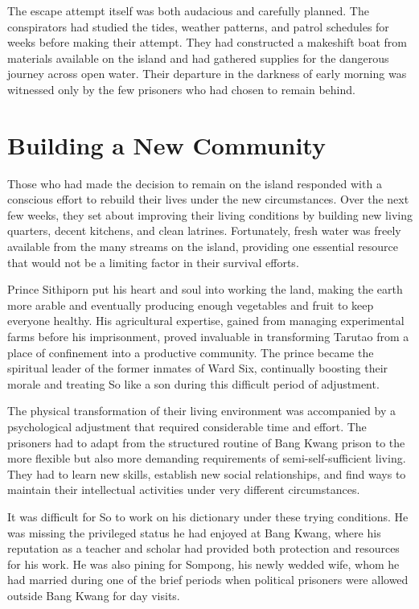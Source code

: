 \documentclass[
  Letterpaper,
]{scrbook}
\begin{document}
The escape attempt itself was both audacious and carefully planned. The
conspirators had studied the tides, weather patterns, and patrol
schedules for weeks before making their attempt. They had constructed a
makeshift boat from materials available on the island and had gathered
supplies for the dangerous journey across open water. Their departure in
the darkness of early morning was witnessed only by the few prisoners
who had chosen to remain behind.

\section{Building a New Community}\label{building-a-new-community}

Those who had made the decision to remain on the island responded with a
conscious effort to rebuild their lives under the new circumstances.
Over the next few weeks, they set about improving their living
conditions by building new living quarters, decent kitchens, and clean
latrines. Fortunately, fresh water was freely available from the many
streams on the island, providing one essential resource that would not
be a limiting factor in their survival efforts.

Prince Sithiporn put his heart and soul into working the land, making
the earth more arable and eventually producing enough vegetables and
fruit to keep everyone healthy. His agricultural expertise, gained from
managing experimental farms before his imprisonment, proved invaluable
in transforming Tarutao from a place of confinement into a productive
community. The prince became the spiritual leader of the former inmates
of Ward Six, continually boosting their morale and treating So like a
son during this difficult period of adjustment.

The physical transformation of their living environment was accompanied
by a psychological adjustment that required considerable time and
effort. The prisoners had to adapt from the structured routine of Bang
Kwang prison to the more flexible but also more demanding requirements
of semi-self-sufficient living. They had to learn new skills, establish
new social relationships, and find ways to maintain their intellectual
activities under very different circumstances.

It was difficult for So to work on his dictionary under these trying
conditions. He was missing the privileged status he had enjoyed at Bang
Kwang, where his reputation as a teacher and scholar had provided both
protection and resources for his work. He was also pining for Sompong,
his newly wedded wife, whom he had married during one of the brief
periods when political prisoners were allowed outside Bang Kwang for day
visits.
\end{document}
